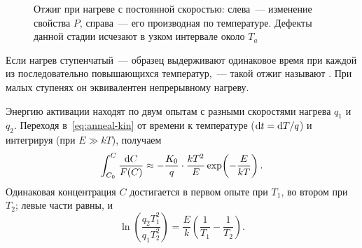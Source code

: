 \begin{figure}[ht]
\centering
{}
\caption{Отжиг при нагреве с постоянной скоростью: слева~— изменение
свойства $P$, справа~— его производная по температуре. Дефекты данной
стадии исчезают в узком интервале около $T_a$}
\label{fig:const-rate}
\end{figure}

Если нагрев ступенчатый~— образец выдерживают одинаковое время при каждой
из последовательно повышающихся температур,~— такой отжиг называют
. При малых ступенях он эквивалентен непрерывному
нагреву.

Энергию активации находят по двум опытам с разными скоростями нагрева
$q_1$ и $q_2$. Переходя в~\eqref{eq:anneal-kin} от времени к температуре
($\mathop{}\!\mathrm{d} t=\mathop{}\!\mathrm{d} T/q$) и интегрируя (при $E\gg kT$), получаем
\[
\int_{C_0}^{C}\frac{\mathop{}\!\mathrm{d} C}{F(C)}\approx-\frac{K_0}{q}\cdot\frac{kT^2}{E}\exp\!\left(-\frac{E}{kT}\right) .
\]
Одинаковая концентрация $C$ достигается в первом опыте при $T_1$, во
втором при $T_2$; левые части равны, и
\begin{equation}\label{eq:const-rate}
\ln\!\left(\frac{q_2T_1^2}{q_1T_2^2}\right)=\frac{E}{k}\left(\frac1{T_1}-\frac1{T_2}\right) .
\end{equation}

